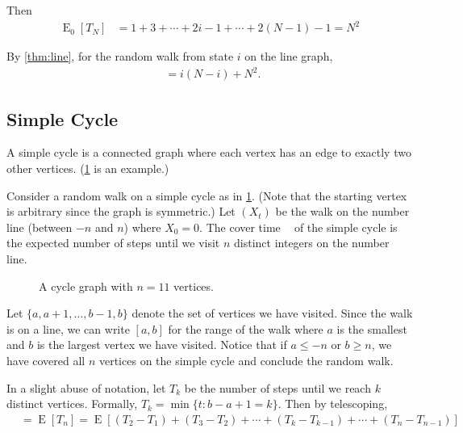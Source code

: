 \documentclass[12pt]{article}
\theoremstyle{definition}
\DeclareMathOperator{\E}{\mathrm{E}}		     %
\DeclareMathOperator{\tcov}{t_\textrm{cov}}      %
\begin{document}
Then
\begin{align}
\E_0[T_N] &= 1 + 3 + \cdots + 2i - 1 + \cdots + 2(N-1) -1 = N^2 \nonumber
\end{align}

By \cref{thm:line}, for the random walk from state $i$ on the line graph,
\begin{align}
\tcov = i(N-i) + N^2. \nonumber
\end{align}

\subsection{Simple Cycle}\label{sec:simple_cycle}

A simple cycle is a connected graph where
each vertex has an edge to exactly two other vertices.
(\cref{fig:cycle} is an example.)

Consider a random walk on a simple cycle as in \cref{fig:cycle}.
(Note that the starting vertex is arbitrary since the graph is symmetric.)
Let $(X_t)$ be the walk on the number line (between $-n$ and $n$)
where $X_0 = 0$.
The cover time $\tcov$ of the simple cycle is the expected number of steps 
until we visit $n$ distinct integers on the number line.

\begin{figure}[ht]
	\centering
	\caption{A cycle graph with $n=11$ vertices.}\label{fig:cycle}
\end{figure}

Let $\{a, a+1, \ldots, b-1, b\}$ 
denote the set of vertices we have visited.
Since the walk is on a line, we can write $[a,b]$ for the range
of the walk where $a$ is the smallest 
and $b$ is the largest vertex we have visited.
Notice that if $a \leq -n$ or $b \geq n$, we have covered all $n$ vertices
on the simple cycle and conclude the random walk.

In a slight abuse of notation, let $T_k$ be the 
number of steps until we reach $k$ distinct vertices.
Formally, $T_k = \min\{t: b-a+1 = k\}$.
Then by telescoping,
\begin{align}
\tcov &= \E[T_n] = \E[(T_2 - T_1) + (T_3 - T_2) + \cdots + 
(T_k - T_{k-1}) + \cdots + (T_n - T_{n-1})] \nonumber
\end{align}
\end{document}
